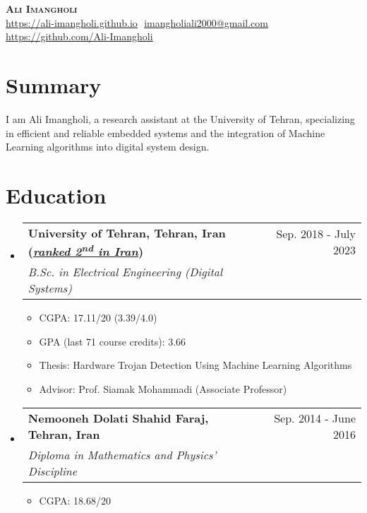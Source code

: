 \documentclass[letterpaper,11pt]{article}
\makeatletter
\newcommand{\resumeItem}[1]{
  \item\small{
    {#1 \vspace{-2pt}}
  }
}
\newcommand{\resumeSubheading}[4]{
  \vspace{-2pt}\item
    \begin{tabular*}{0.97\textwidth}[t]{l@{\extracolsep{\fill}}r}
      \textbf{#1} & #2 \\
      \textit{\small#3} & \textit{\small #4} \\
    \end{tabular*}\vspace{-7pt}
}
\newcommand{\resumeSubHeadingListStart}{\begin{itemize}[leftmargin=0.15in, label={}]}
\newcommand{\resumeSubHeadingListEnd}{\end{itemize}}
\newcommand{\resumeItemListStart}{\begin{itemize}}
\newcommand{\resumeItemListEnd}{\end{itemize}\vspace{-5pt}}
\makeatother
\begin{document}
\vspace{-7pt}

\begin{center}
    \textbf{\Huge \scshape Ali Imangholi} \\ \vspace{8pt}
    \small
    \href{https://ali-imangholi.github.io}
    {\underline{https://ali-imangholi.github.io}} $  $
    \href{mailto:imangholiali2000@gmail.com}
    {\underline{imangholiali2000@gmail.com}}
    \href{https://github.com/Ali-Imangholi}{\underline{https://github.com/Ali-Imangholi}} $  $
\end{center}

\section{Summary}
I am Ali Imangholi, a research assistant at the University of Tehran, specializing in efficient and reliable embedded systems and the integration of Machine Learning algorithms into digital system design.
\section{Education}
  \resumeSubHeadingListStart
  
    \resumeSubheading
      {University of Tehran, Tehran, Iran (\href{https://www.topuniversities.com/university-rankings/world-university-rankings/2024?\&countries=ir}{\textit{\underline{ranked 2\textsuperscript{nd} in Iran}}})}{Sep. 2018 - July 2023}
      {B.Sc. in Electrical Engineering (Digital Systems)}{}
        \resumeItemListStart
            \resumeItem{CGPA: 17.11/20 (3.39/4.0)}
            \resumeItem{GPA (last 71 course credits): 3.66 }
	\resumeItem{Thesis: Hardware Trojan Detection Using Machine Learning Algorithms}
	\resumeItem{Advisor: Prof. Siamak Mohammadi (Associate Professor)}
        \resumeItemListEnd

    \resumeSubheading
      {Nemooneh Dolati Shahid Faraj, Tehran, Iran}{Sep. 2014 - June 2016}
      {Diploma in Mathematics and Physics’ Discipline}{}
        \resumeItemListStart
            \resumeItem{CGPA: 18.68/20}
        \resumeItemListEnd
  \resumeSubHeadingListEnd

\end{document}
